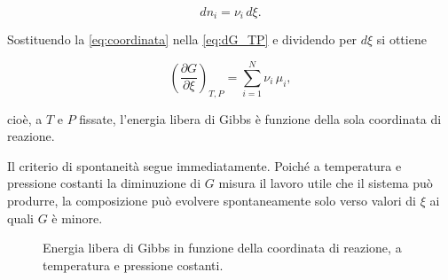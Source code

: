 \begin{equation}
    dn_i = \nu_i\,d\xi .
    \label{eq:coordinata}
\end{equation}

Sostituendo la \eqref{eq:coordinata} nella \eqref{eq:dG_TP} e dividendo per $d\xi$ si ottiene

\begin{equation}
    \left(\frac{\partial G}{\partial \xi}\right)_{T,P} = \sum_{i=1}^{N}\nu_i\,\mu_i ,
    \label{eq:derivata_xi}
\end{equation}

cioè, a $T$ e $P$ fissate, l'energia libera di Gibbs è funzione della sola coordinata di reazione.

Il criterio di spontaneità segue immediatamente.
Poiché a temperatura e pressione costanti la diminuzione di $G$ misura il lavoro utile che il sistema può produrre, la composizione può evolvere spontaneamente solo verso valori di $\xi$ ai quali $G$ è minore.

\begin{figure}[htbp]
    \centering
    \caption{Energia libera di Gibbs in funzione della coordinata di reazione, a temperatura e pressione costanti.}
    \label{fig:gibbs_xi}
\end{figure}

